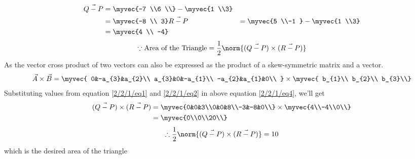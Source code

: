 \begin{align} \label{2/2/1/eq1}
%
\Vec{Q-P} & =\myvec{-7 \\6 \\} -\myvec{1 \\3}\\
 & = \myvec{-8 \\ 3}
%
%
 \label{2/2/1/eq2}
\Vec{R-P} & =\myvec{5 \\-1 } -\myvec{1 \\3}\\
 & = \myvec{4 \\ -4}
\end{align}
\begin{align} \label{2/2/1/eq3}
    \because
    \text{Area of the Triangle}  = \frac{1}{2}\norm{(\Vec{Q-P})\times ( \Vec{R-P} )}
\end{align}
    As the vector cross product of two vectors can also be expressed as the product of a skew-symmetric matrix and a vector.
\begin{align} \label{2/2/1/eq4}
    \Vec{A}\times  \Vec{B}  = 
    \myvec{
    0&-a_{3}&a_{2}\\
    a_{3}&0&-a_{1}\\
    -a_{2}&a_{1}&0\\
    }
    \times \myvec{
    b_{1}\\
    b_{2}\\
    b_{3}\\}
\end{align}
    Substituting values from equation \ref{2/2/1/eq1} and \ref{2/2/1/eq2} in above equation \ref{2/2/1/eq4}, we'll get
\begin{equation} \label{2/2/1/eq5}
\begin{split}
(\Vec{Q-P})\times ( \Vec{R-P} ) & = \myvec{0&0&3\\0&0&8\\-3&-8&0\\} \times \myvec{4\\-4\\0\\}\\
 & = \myvec{0\\0\\20\\}
\end{split}
\end{equation}
\begin{align} \label{2/2/1/eq6}
    \therefore \frac{1}{2}\norm{(\Vec{Q-P})\times ( \Vec{R-P} )}  = 10
\end{align}
which is the desired area of  the triangle 
